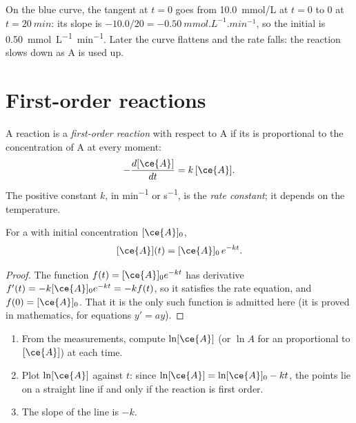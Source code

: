 \begin{example}\label{ex:g12:reaction-rates:initial}
On the blue curve, the tangent at $t = 0$ goes from \qty{10.0}{mmol/L} at
$t = 0$ to $0$ at $t = \qty{20}{min}$: its slope is
$-10.0/20 = \qty{-0.50}{mmol.L^{-1}.min^{-1}}$, so the initial  is \qty{0.50}{mmol.L^{-1}.min^{-1}}. Later the curve flattens
and the rate falls: the reaction slows down as A is used up.
\end{example}

\section{First-order reactions}

\begin{definition}\label{def:g12:reaction-rates:first-order}
A reaction is a \emph{first-order reaction}
with respect to A if its  is proportional to the
concentration of A at every moment:
\[
  -\frac{d[\ce{A}]}{dt} = k\,[\ce{A}] .
\]
The positive constant $k$, in \si{min^{-1}} or \si{s^{-1}}, is the
\emph{rate constant}; it depends on the temperature.
\end{definition}

\begin{proposition}\label{prop:g12:reaction-rates:exponential}
For a  with initial concentration $[\ce{A}]_0$,
\[
  [\ce{A}](t) = [\ce{A}]_0\, e^{-kt} .
\]
\end{proposition}

\begin{proof}
The function $f(t) = [\ce{A}]_0 e^{-kt}$ has derivative
$f'(t) = -k [\ce{A}]_0 e^{-kt} = -k f(t)$, so it satisfies the rate
equation, and $f(0) = [\ce{A}]_0$. That it is the only such function is
admitted here (it is proved in mathematics, for equations $y' = ay$).
\end{proof}

\begin{method}\label{met:g12:reaction-rates:test}
\begin{enumerate}
  \item From the measurements, compute $\ln [\ce{A}]$ (or $\ln A$ for an
         proportional to $[\ce{A}]$) at each time.
  \item Plot $\ln[\ce{A}]$ against $t$: since
        $\ln[\ce{A}] = \ln[\ce{A}]_0 - kt$, the points lie on a straight
        line if and only if the reaction is first order.
  \item The slope of the line is $-k$.
\end{enumerate}
\end{method}

